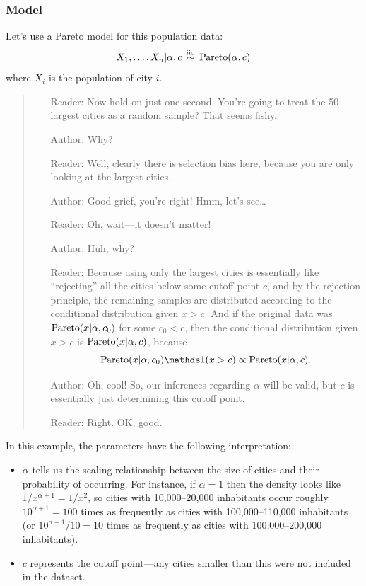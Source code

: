 \documentclass[12pt]{article}
\begin{document}
\subsubsection{Model}
Let's use a Pareto model for this population data:
$$X_1,\ldots,X_n|\alpha,c\, \stackrel{\mathrm{iid}}{\sim} \, \operatorname*{Pareto}(\alpha,c)$$
where $X_i$ is the population of city $i$. 
\begin{quote}
\it
\begin{itemize}
\item[Reader:] Now hold on just one second. You're going to treat the 50 largest cities as a random sample? That seems fishy.
\item[Author:] Why?
\item[Reader:] Well, clearly there is selection bias here, because you are only looking at the largest cities.
\item[Author:] Good grief, you're right! Hmm, let's see\dots
\item[Reader:] Oh, wait---it doesn't matter!
\item[Author:] Huh, why?
\item[Reader:] Because using only the largest cities is essentially like ``rejecting'' all the cities below some cutoff point $c$, and by the rejection principle, the remaining samples are distributed according to the conditional distribution given $x>c$. And if the original data was $\operatorname*{Pareto}(x|\alpha,c_0)$ for some $c_0<c$, then the conditional distribution given $x>c$ is $\operatorname*{Pareto}(x|\alpha,c)$, because
$$ \Pareto(x|\alpha,c_0)\I(x>c)\propto 
\Pareto(x|\alpha,c). $$
\item[Author:] Oh, cool! So, our inferences regarding $\alpha$ will be valid, but $c$ is essentially just determining this cutoff point.
\item[Reader:] Right.  OK, good.
\end{itemize}
\end{quote}
In this example, the parameters have the following interpretation:
\begin{itemize}
\item $\alpha$ tells us the scaling relationship between the size of cities and their probability of occurring. For instance, if $\alpha = 1$
    then the density looks like $1/x^{\alpha +1} = 1/x^2$, so cities with 10,000--20,000 inhabitants occur roughly $10^{\alpha+1} = 100$
    times as frequently as cities with 100,000--110,000 inhabitants (or $10^{\alpha +1}/10 = 10$ times as frequently as cities with
    100,000--200,000 inhabitants).
\item $c$ represents the cutoff point---any cities smaller than this were not included in the dataset.
\end{itemize}
\end{document}

